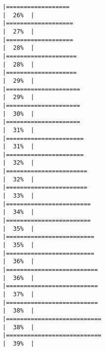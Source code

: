 \documentclass[
]{article}
\begin{document}
\begin{verbatim}
|==================                                                    |  26%  |                                                                              |===================                                                   |  27%  |                                                                              |===================                                                   |  28%  |                                                                              |====================                                                  |  28%  |                                                                              |====================                                                  |  29%  |                                                                              |=====================                                                 |  29%  |                                                                              |=====================                                                 |  30%  |                                                                              |=====================                                                 |  31%  |                                                                              |======================                                                |  31%  |                                                                              |======================                                                |  32%  |                                                                              |=======================                                               |  32%  |                                                                              |=======================                                               |  33%  |                                                                              |========================                                              |  34%  |                                                                              |========================                                              |  35%  |                                                                              |=========================                                             |  35%  |                                                                              |=========================                                             |  36%  |                                                                              |==========================                                            |  36%  |                                                                              |==========================                                            |  37%  |                                                                              |==========================                                            |  38%  |                                                                              |===========================                                           |  38%  |                                                                              |===========================                                           |  39%  |                                                                              
\end{verbatim}
\end{document}
